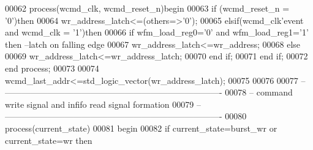 \begin{DoxyCode}
00062 \textcolor{keywordflow}{process}(wcmd_clk, wcmd_reset_n)\textcolor{keywordflow}{begin}
00063     \textcolor{keywordflow}{if} \textcolor{vhdlchar}{(}\textcolor{vhdlchar}{wcmd_reset_n} \textcolor{vhdlchar}{=} \textcolor{vhdlchar}{'}\textcolor{vhdllogic}{}\textcolor{vhdllogic}{0}\textcolor{vhdlchar}{'}\textcolor{vhdlchar}{)}\textcolor{keywordflow}{then}
00064         \textcolor{vhdlchar}{wr_address_latch}\textcolor{vhdlchar}{<=}\textcolor{vhdlchar}{(}\textcolor{keywordflow}{others}\textcolor{vhdlchar}{=}\textcolor{vhdlchar}{>}\textcolor{vhdlchar}{'}\textcolor{vhdllogic}{}\textcolor{vhdllogic}{0}\textcolor{vhdlchar}{'}\textcolor{vhdlchar}{)};
00065     \textcolor{keywordflow}{elsif}\textcolor{vhdlchar}{(}\textcolor{vhdlchar}{wcmd_clk}\textcolor{vhdlchar}{'}\textcolor{vhdlkeyword}{event} \textcolor{keywordflow}{and} \textcolor{vhdlchar}{wcmd_clk} \textcolor{vhdlchar}{=} \textcolor{vhdlchar}{'}\textcolor{vhdllogic}{}\textcolor{vhdllogic}{1}\textcolor{vhdlchar}{'}\textcolor{vhdlchar}{)}\textcolor{keywordflow}{then} 
00066         \textcolor{keywordflow}{if} \textcolor{vhdlchar}{wfm_load_reg0}\textcolor{vhdlchar}{=}\textcolor{vhdlchar}{'}\textcolor{vhdllogic}{}\textcolor{vhdllogic}{0}\textcolor{vhdlchar}{'} \textcolor{keywordflow}{and} \textcolor{vhdlchar}{wfm_load_reg1}\textcolor{vhdlchar}{=}\textcolor{vhdlchar}{'}\textcolor{vhdllogic}{}\textcolor{vhdllogic}{1}\textcolor{vhdlchar}{'} \textcolor{keywordflow}{then}\textcolor{keyword}{ --latch on falling edge}
00067             \textcolor{vhdlchar}{wr_address_latch}\textcolor{vhdlchar}{<=}\textcolor{vhdlchar}{wr_address};
00068         \textcolor{keywordflow}{else} 
00069             \textcolor{vhdlchar}{wr_address_latch}\textcolor{vhdlchar}{<=}\textcolor{vhdlchar}{wr_address_latch};
00070         \textcolor{keywordflow}{end} \textcolor{keywordflow}{if};
00071     \textcolor{keywordflow}{end} \textcolor{keywordflow}{if}; 
00072 \textcolor{keywordflow}{end} \textcolor{keywordflow}{process};
00073 
00074 \textcolor{vhdlchar}{wcmd_last_addr}\textcolor{vhdlchar}{<=}\textcolor{comment}{std\_logic\_vector}\textcolor{vhdlchar}{(}\textcolor{vhdlchar}{wr_address_latch}\textcolor{vhdlchar}{)};
00075 
00076 
00077 \textcolor{keyword}{-- ----------------------------------------------------------------------------}
00078 \textcolor{keyword}{-- command write signal and infifo read signal formation}
00079 \textcolor{keyword}{-- ----------------------------------------------------------------------------}
00080 \textcolor{keywordflow}{process}(current_state)
00081 \textcolor{vhdlkeyword}{begin }
00082     \textcolor{keywordflow}{if} \textcolor{vhdlchar}{current_state}\textcolor{vhdlchar}{=}\textcolor{vhdlchar}{burst\_wr} \textcolor{keywordflow}{or} \textcolor{vhdlchar}{current_state}\textcolor{vhdlchar}{=}\textcolor{vhdlchar}{wr} \textcolor{keywordflow}{then} 

\end{DoxyCode}

